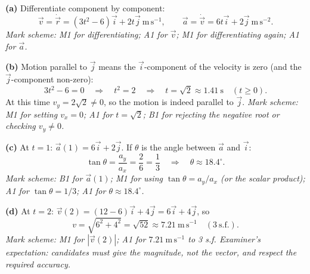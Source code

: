 \documentclass[11pt]{article}
\begin{document}
\begin{corrige}
\textbf{(a)} Differentiate component by component:
\[ \vec{v} = \dot{\vec{r}} = (3t^2 - 6)\vec{i} + 2t\vec{j}\ \mathrm{m\,s^{-1}}, \qquad \vec{a} = \dot{\vec{v}} = 6t\vec{i} + 2\vec{j}\ \mathrm{m\,s^{-2}}. \]
\emph{Mark scheme: M1 for differentiating; A1 for $\vec{v}$; M1 for differentiating again; A1 for $\vec{a}$.}

\textbf{(b)} Motion parallel to $\vec{j}$ means the $\vec{i}$-component of the velocity is zero (and the $\vec{j}$-component non-zero):
\[ 3t^2 - 6 = 0 \quad\Longrightarrow\quad t^2 = 2 \quad\Longrightarrow\quad t = \sqrt{2} \approx 1.41\ \mathrm{s} \quad (t \geq 0). \]
At this time $v_y = 2\sqrt{2} \neq 0$, so the motion is indeed parallel to $\vec{j}$.
\emph{Mark scheme: M1 for setting $v_x = 0$; A1 for $t = \sqrt{2}$; B1 for rejecting the negative root or checking $v_y \neq 0$.}

\textbf{(c)} At $t = 1$: $\vec{a}(1) = 6\vec{i} + 2\vec{j}$. If $\theta$ is the angle between $\vec{a}$ and $\vec{i}$:
\[ \tan\theta = \frac{a_y}{a_x} = \frac{2}{6} = \frac{1}{3} \quad\Longrightarrow\quad \theta \approx 18.4^{\circ}. \]
\emph{Mark scheme: B1 for $\vec{a}(1)$; M1 for using $\tan\theta = a_y/a_x$ (or the scalar product); A1 for $\tan\theta = 1/3$; A1 for $\theta \approx 18.4^{\circ}$.}

\textbf{(d)} At $t = 2$: $\vec{v}(2) = (12 - 6)\vec{i} + 4\vec{j} = 6\vec{i} + 4\vec{j}$, so
\[ v = \sqrt{6^2 + 4^2} = \sqrt{52} \approx 7.21\ \mathrm{m\,s^{-1}} \quad (3\ \text{s.f.}). \]
\emph{Mark scheme: M1 for $|\vec{v}(2)|$; A1 for $7.21\ \mathrm{m\,s^{-1}}$ to 3 s.f. Examiner's expectation: candidates must give the magnitude, not the vector, and respect the required accuracy.}
\end{corrige}
\end{document}
